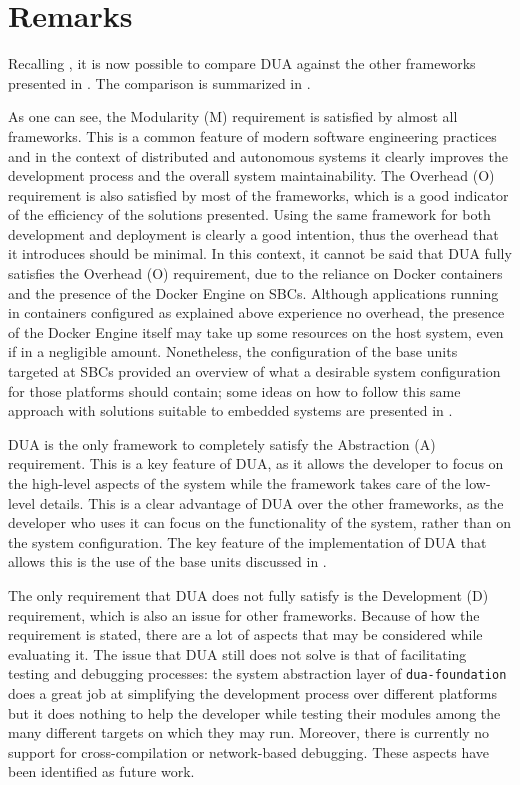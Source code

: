 \section{Remarks}
\label{sec:dua_remarks}
Recalling , it is now possible to compare DUA against the other frameworks presented in . The comparison is summarized in .

As one can see, the Modularity (M) requirement is satisfied by almost all frameworks. This is a common feature of modern software engineering practices and in the context of distributed and autonomous systems it clearly improves the development process and the overall system maintainability. The Overhead (O) requirement is also satisfied by most of the frameworks, which is a good indicator of the efficiency of the solutions presented. Using the same framework for both development and deployment is clearly a good intention, thus the overhead that it introduces should be minimal. In this context, it cannot be said that DUA fully satisfies the Overhead (O) requirement, due to the reliance on Docker containers and the presence of the Docker Engine on SBCs. Although applications running in containers configured as explained above experience no overhead, the presence of the Docker Engine itself may take up some resources on the host system, even if in a negligible amount. Nonetheless, the configuration of the base units targeted at SBCs provided an overview of what a desirable system configuration for those platforms should contain; some ideas on how to follow this same approach with solutions suitable to embedded systems are presented in .

DUA is the only framework to completely satisfy the Abstraction (A) requirement. This is a key feature of DUA, as it allows the developer to focus on the high-level aspects of the system while the framework takes care of the low-level details. This is a clear advantage of DUA over the other frameworks, as the developer who uses it can focus on the functionality of the system, rather than on the system configuration. The key feature of the implementation of DUA that allows this is the use of the base units discussed in .

The only requirement that DUA does not fully satisfy is the Development (D) requirement, which is also an issue for other frameworks. Because of how the requirement is stated, there are a lot of aspects that may be considered while evaluating it. The issue that DUA still does not solve is that of facilitating testing and debugging processes: the system abstraction layer of \texttt{dua-foundation} does a great job at simplifying the development process over different platforms but it does nothing to help the developer while testing their modules among the many different targets on which they may run. Moreover, there is currently no support for cross-compilation or network-based debugging. These aspects have been identified as future work.

